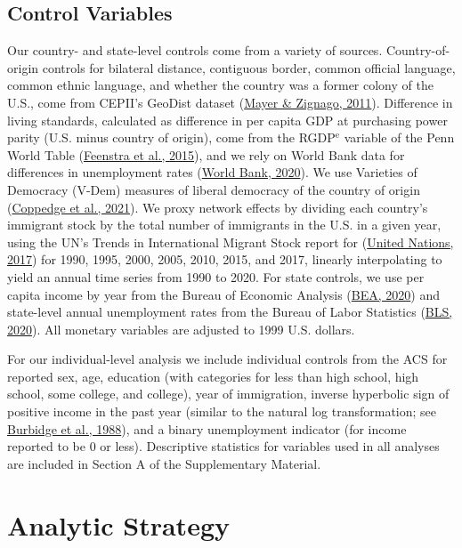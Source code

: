 \documentclass[
  11pt,
]{article}
\begin{document}
\hypertarget{control-variables}{%
\subsection{Control Variables}\label{control-variables}}

Our country- and state-level controls come from a variety of sources. Country-of-origin controls for bilateral distance, contiguous border, common official language, common ethnic language, and whether the country was a former colony of the U.S., come from CEPII's GeoDist dataset (\protect\hyperlink{ref-mayer_2011}{Mayer \& Zignago, 2011}). Difference in living standards, calculated as difference in per capita GDP at purchasing power parity (U.S. minus country of origin), come from the RGDP\(^\text{e}\) variable of the Penn World Table (\protect\hyperlink{ref-feenstra_2015}{Feenstra et al., 2015}), and we rely on World Bank data for differences in unemployment rates (\protect\hyperlink{ref-worldbank_2020}{World Bank, 2020}). We use Varieties of Democracy (V-Dem) measures of liberal democracy of the country of origin (\protect\hyperlink{ref-coppedge_2021}{Coppedge et al., 2021}). We proxy network effects by dividing each country's immigrant stock by the total number of immigrants in the U.S. in a given year, using the UN's Trends in International Migrant Stock report for (\protect\hyperlink{ref-unitednations_2017}{United Nations, 2017}) for 1990, 1995, 2000, 2005, 2010, 2015, and 2017, linearly interpolating to yield an annual time series from 1990 to 2020. For state controls, we use per capita income by year from the Bureau of Economic Analysis (\protect\hyperlink{ref-bea_2020}{BEA, 2020}) and state-level annual unemployment rates from the Bureau of Labor Statistics (\protect\hyperlink{ref-bls_2020}{BLS, 2020}). All monetary variables are adjusted to 1999 U.S. dollars.

For our individual-level analysis we include individual controls from the ACS for reported sex, age, education (with categories for less than high school, high school, some college, and college), year of immigration, inverse hyperbolic sign of positive income in the past year (similar to the natural log transformation; see \protect\hyperlink{ref-burbidge_1988_alternative}{Burbidge et al., 1988}), and a binary unemployment indicator (for income reported to be 0 or less). Descriptive statistics for variables used in all analyses are included in Section A of the Supplementary Material.

\hypertarget{analytic-strategy}{%
\section{Analytic Strategy}\label{analytic-strategy}}
\end{document}
